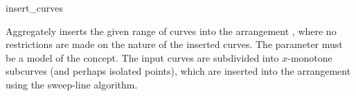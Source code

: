 
\ccRefPageBegin

\begin{ccRefFunction}{insert_curves}


   {Aggregately inserts the given range of curves \ccc{[first,last)} into
    the arrangement , where no restrictions are made on the nature of
    the inserted curves. The  parameter must be a model of the
     concept. The input curves are subdivided into
    $x$-monotone subcurves (and perhaps isolated points), which are inserted
    into the arrangement using the sweep-line algorithm.
    }

\end{ccRefFunction}

\ccRefPageEnd
